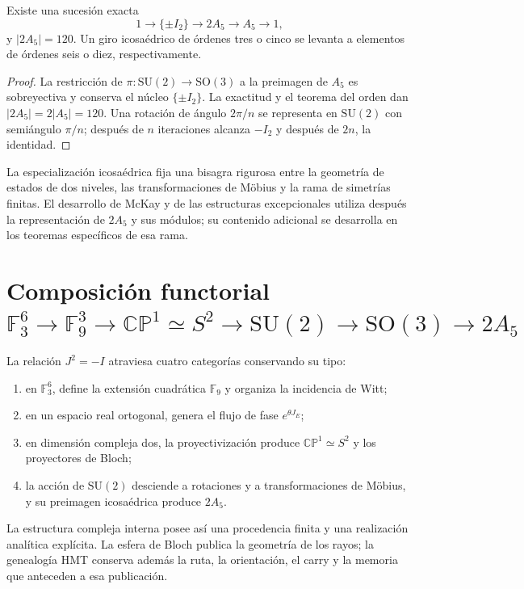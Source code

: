 \begin{proposition}
\label{prop:extension-central-2A5-anexo}
Existe una sucesión exacta
\begin{equation}
 1\longrightarrow\{\pm I_2\}
 \longrightarrow2A_5
 \longrightarrow A_5
 \longrightarrow1,
 \label{eq:sucesion-2A5-anexo}
\end{equation}
y \(|2A_5|=120\). Un giro icosaédrico de órdenes tres o cinco se levanta a
elementos de órdenes seis o diez, respectivamente.
\end{proposition}

\begin{proof}
La restricción de \(\pi:\mathrm{SU}(2)\to\mathrm{SO}(3)\) a la preimagen de
\(A_5\) es sobreyectiva y conserva el núcleo \(\{\pm I_2\}\). La exactitud y
el teorema del orden dan \(|2A_5|=2|A_5|=120\). Una rotación de ángulo
\(2\pi/n\) se representa en \(\mathrm{SU}(2)\) con semiángulo
\(\pi/n\); después de \(n\) iteraciones alcanza \(-I_2\) y después de
\(2n\), la identidad.
\end{proof}

La especialización icosaédrica fija una bisagra rigurosa entre la geometría de
estados de dos niveles, las transformaciones de Möbius y la rama de simetrías
finitas. El desarrollo de McKay y de las estructuras excepcionales utiliza
después la representación de \(2A_5\) y sus módulos; su contenido adicional
se desarrolla en los teoremas específicos de esa rama.

\section{Composición functorial \texorpdfstring{\(\mathbb F_3^6\to\mathbb F_9^3\to\mathbb{CP}^{1}\simeq S^2\to\mathrm{SU}(2)\to\mathrm{SO}(3)\to 2A_5\)}{F3^6 -> F9^3 -> CP1 -> S2 -> SU(2) -> SO(3) -> 2A5}}

La relación \(J^2=-I\) atraviesa cuatro categorías conservando su tipo:
\begin{enumerate}
 \item en \(\mathbb F_3^6\), define la extensión cuadrática
       \(\mathbb F_9\) y organiza la incidencia de Witt;
 \item en un espacio real ortogonal, genera el flujo de fase
       \(e^{\theta J_E}\);
 \item en dimensión compleja dos, la proyectivización produce
       \(\mathbb{CP}^{1}\simeq S^2\) y los proyectores de Bloch;
 \item la acción de \(\mathrm{SU}(2)\) desciende a rotaciones y a
       transformaciones de Möbius, y su preimagen icosaédrica produce
       \(2A_5\).
\end{enumerate}
La estructura compleja interna posee así una procedencia finita y una
realización analítica explícita. La esfera de Bloch publica la geometría de los
rayos; la genealogía HMT conserva además la ruta, la orientación, el carry y la
memoria que anteceden a esa publicación.

